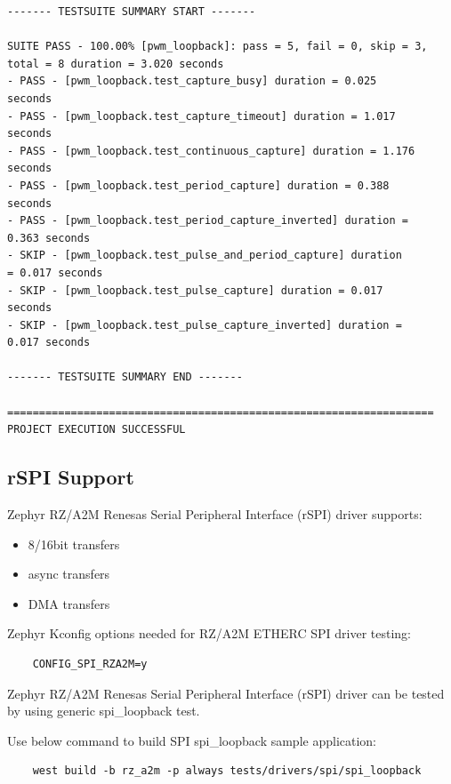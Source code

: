 \documentclass[11pt,a4paper,oneside]{article}
\begin{document}
\begin{lstlisting}
------- TESTSUITE SUMMARY START -------

SUITE PASS - 100.00% [pwm_loopback]: pass = 5, fail = 0, skip = 3,
total = 8 duration = 3.020 seconds
- PASS - [pwm_loopback.test_capture_busy] duration = 0.025
seconds
- PASS - [pwm_loopback.test_capture_timeout] duration = 1.017
seconds
- PASS - [pwm_loopback.test_continuous_capture] duration = 1.176
seconds
- PASS - [pwm_loopback.test_period_capture] duration = 0.388
seconds
- PASS - [pwm_loopback.test_period_capture_inverted] duration =
0.363 seconds
- SKIP - [pwm_loopback.test_pulse_and_period_capture] duration
= 0.017 seconds
- SKIP - [pwm_loopback.test_pulse_capture] duration = 0.017
seconds
- SKIP - [pwm_loopback.test_pulse_capture_inverted] duration =
0.017 seconds

------- TESTSUITE SUMMARY END -------

===================================================================
PROJECT EXECUTION SUCCESSFUL
\end{lstlisting}

\subsection{rSPI Support}\label{rspi-support}

Zephyr RZ/A2M Renesas Serial Peripheral Interface (rSPI) driver supports:
\begin{itemize}
	\item 8/16bit transfers
	\item async transfers
	\item DMA transfers
\end{itemize}

Zephyr Kconfig options needed for RZ/A2M ETHERC SPI driver testing:

\begin{lstlisting}
	CONFIG_SPI_RZA2M=y
\end{lstlisting}

Zephyr RZ/A2M Renesas Serial Peripheral Interface (rSPI) driver can be tested by using generic spi\_loopback test.

Use below command to build SPI spi\_loopback sample application:

\begin{lstlisting}
	west build -b rz_a2m -p always tests/drivers/spi/spi_loopback
\end{lstlisting}
\end{document}
